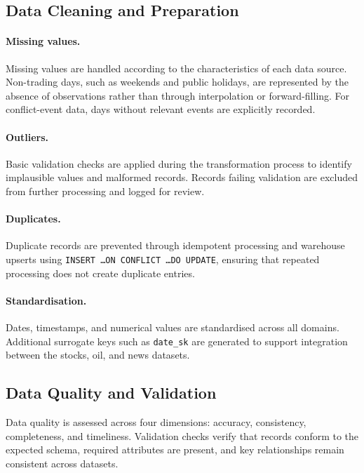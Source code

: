 \documentclass[11pt,a4paper]{article}
\begin{document}
\subsection{Data Cleaning and Preparation}
\label{sec:data_cleaning}

\paragraph{Missing values.}
Missing values are handled according to the characteristics of each
data source. Non-trading days, such as weekends and public holidays,
are represented by the absence of observations rather than through
interpolation or forward-filling. For conflict-event data, days
without relevant events are explicitly recorded.

\paragraph{Outliers.}
Basic validation checks are applied during the transformation process
to identify implausible values and malformed records. Records failing
validation are excluded from further processing and logged for review.

\paragraph{Duplicates.}
Duplicate records are prevented through idempotent processing and
warehouse upserts using \texttt{INSERT \dots ON CONFLICT \dots DO
UPDATE}, ensuring that repeated processing does not create duplicate
entries.

\paragraph{Standardisation.}
Dates, timestamps, and numerical values are standardised across all
domains. Additional surrogate keys such as \texttt{date\_sk} are
generated to support integration between the stocks, oil, and news
datasets.

\subsection{Data Quality and Validation}
\label{sec:data_quality}

Data quality is assessed across four dimensions: accuracy,
consistency, completeness, and timeliness. Validation checks verify
that records conform to the expected schema, required attributes are
present, and key relationships remain consistent across datasets.
\end{document}
